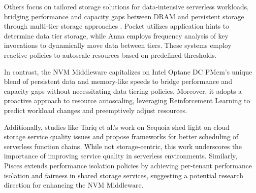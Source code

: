 Others focus on tailored storage solutions for data-intensive serverless workloads, bridging performance and capacity gaps between DRAM and persistent storage through multi-tier storage approaches \cite{klimovic2018pocket,wu2019autoscaling}. Pocket \cite{klimovic2018pocket} utilizes application hints to determine data tier storage, while Anna \cite{wu2019autoscaling} employs frequency analysis of key invocations to dynamically move data between tiers. These systems employ reactive policies to autoscale resources based on predefined thresholds.

In contrast, the NVM Middleware capitalizes on Intel Optane DC PMem's unique blend of persistent data and memory-like speeds to bridge performance and capacity gaps without necessitating data tiering policies. Moreover, it adopts a proactive approach to resource autoscaling, leveraging Reinforcement Learning to predict workload changes and preemptively adjust resources.

Additionally, studies like Tariq et al.'s work on Sequoia \cite{tariq2020sequoia} shed light on cloud storage service quality issues and propose frameworks for better scheduling of serverless function chains. While not storage-centric, this work underscores the importance of improving service quality in serverless environments. Similarly, Pisces \cite{180275} extends performance isolation policies by achieving per-tenant performance isolation and fairness in shared storage services, suggesting a potential research direction for enhancing the NVM Middleware.




